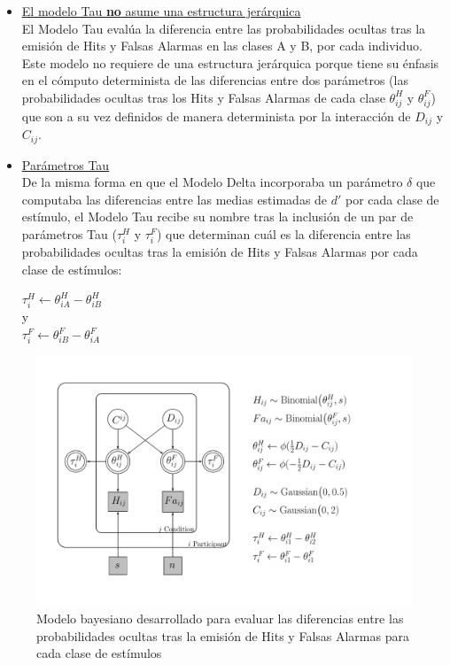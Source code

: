 \begin{itemize}
\item \underline{El modelo Tau \textbf{no} asume una estructura jerárquica}\\

El Modelo Tau evalúa la diferencia entre las probabilidades ocultas tras la emisión de Hits y Falsas Alarmas en las clases A y B, por cada individuo. Este modelo no requiere de una estructura jerárquica porque tiene su énfasis en el cómputo determinista de las diferencias entre dos parámetros (las probabilidades ocultas tras los Hits y Falsas Alarmas de cada clase $\theta^H_{ij}$ y $\theta^F_{ij}$) que son a su vez definidos de manera determinista por la interacción de $D_{ij}$ y $C_{ij}$.\\

\item \underline{Parámetros Tau}\\

De la misma forma en que el Modelo Delta incorporaba un parámetro $\delta$ que computaba las diferencias entre las medias estimadas de $d'$ por cada clase de estímulo, el Modelo Tau recibe su nombre tras la inclusión de un par de parámetros Tau ($\tau^H_{i}$ y $\tau^F_{i}$) que determinan cuál es la diferencia entre las probabilidades ocultas tras la emisión de Hits y Falsas Alarmas por cada clase de estímulos:\\

\begin{center}
$\tau^H_{i}\gets \theta^H_{iA}-\theta^H_{iB}$\\
y\\
$\tau^F_{i}\gets \theta^F_{iB}-\theta^F_{iA}$\\
\end{center}

\end{itemize}

\begin{figure}[th]
\centering
\includegraphics[width=1.1\textwidth]{Figures/Model_Tau_Diff_Tetas}
\caption[Modelo Tau: Modelo Bayesiano para evaluar las diferencias entre las tasas de Hits y Falsas Alarmas obtenidas por cada clase de estímulos]{Modelo bayesiano desarrollado para evaluar las diferencias entre las probabilidades ocultas tras la emisión de Hits y Falsas Alarmas para cada clase de estímulos}
\label{fig:Mod_Tau}
\end{figure}

